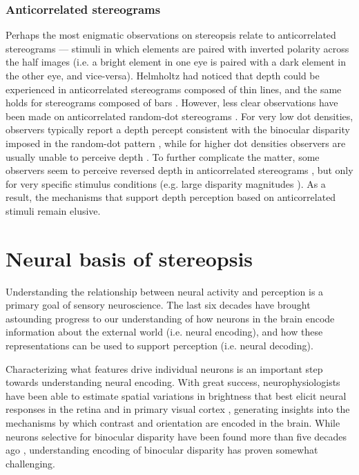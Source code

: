 \subsubsection{Anticorrelated stereograms} \label{sssec: ards}

Perhaps the most enigmatic observations on stereopsis relate to anticorrelated stereograms --- stimuli in which elements are paired with inverted polarity across the half images (i.e. a bright element in one eye is paired with a dark element in the other eye, and vice-versa). Helmholtz had noticed that depth could be experienced in anticorrelated stereograms composed of thin lines, and the same holds for stereograms composed of bars \cite{Cumming:1998ib}. However, less clear observations have been made on anticorrelated random-dot stereograms \cite{Cogan:1993yr, Cumming:1998ib, Tanabe:2008gx, Doi:2011ku, Hibbard2014}. For very low dot densities, observers typically report a depth percept consistent with the binocular disparity imposed in the random-dot pattern \cite{Cogan:1993yr, Cumming:1998ib}, while for higher dot densities observers are usually unable to perceive depth \cite{JULESZ:1964ff, Hibbard2014}. To further complicate the matter, some observers seem to perceive reversed depth in anticorrelated stereograms \cite{Tanabe:2008gx, Doi:2011ku,Read:2000kx}, but only for very specific stimulus conditions (e.g. large disparity magnitudes \cite{Doi:2011ku}). As a result, the mechanisms that support depth perception based on anticorrelated stimuli remain elusive.


\section{Neural basis of stereopsis}  

Understanding the relationship between neural activity and perception is a primary goal of sensory neuroscience. The last six decades have brought astounding progress to our understanding of how neurons in the brain encode information about the external world (i.e. neural encoding), and how these representations can be used to support perception (i.e. neural decoding). 

Characterizing what features drive individual neurons is an important step towards understanding neural encoding. With great success, neurophysiologists have been able to estimate spatial variations in brightness that best elicit neural responses in the retina \cite{Lettvin:1959gs,Levick:1967fk,Barlow:1972bh} and in primary visual cortex \cite{HUBEL:1959tz, HUBEL:1962ti, Hubel:1968hz}, generating insights into the mechanisms by which contrast and orientation are encoded in the brain. While neurons selective for binocular disparity have been found more than five decades ago \cite{Barlow:1967bs,Nikara:1968ys,Pettigrew:1968zr}, understanding encoding of binocular disparity has proven somewhat challenging.

